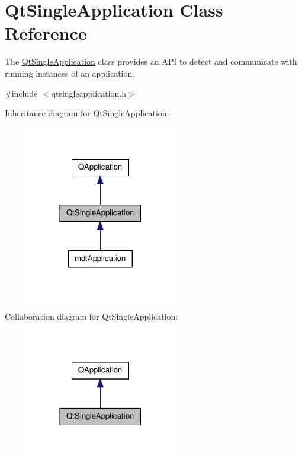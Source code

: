 \hypertarget{class_qt_single_application}{\section{Qt\-Single\-Application Class Reference}
\label{class_qt_single_application}
}


The \hyperlink{class_qt_single_application}{Qt\-Single\-Application} class provides an A\-P\-I to detect and communicate with running instances of an application.  




{\ttfamily \#include $<$qtsingleapplication.\-h$>$}



Inheritance diagram for Qt\-Single\-Application\-:
\nopagebreak
\begin{figure}[H]
\begin{center}
\leavevmode
\includegraphics[width=182pt]{class_qt_single_application__inherit__graph}
\end{center}
\end{figure}


Collaboration diagram for Qt\-Single\-Application\-:
\nopagebreak
\begin{figure}[H]
\begin{center}
\leavevmode
\includegraphics[width=182pt]{class_qt_single_application__coll__graph}
\end{center}
\end{figure}
